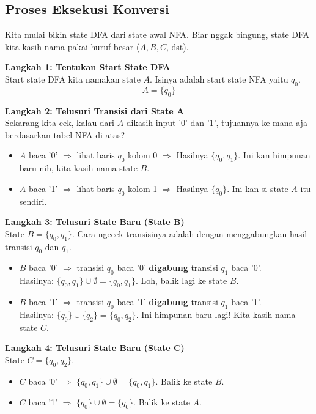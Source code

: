 \documentclass[12pt,a4paper]{article}
\begin{document}
\subsection{Proses Eksekusi Konversi}
Kita mulai bikin state DFA dari state awal NFA. Biar nggak bingung, state DFA kita kasih nama pakai huruf besar ($A, B, C$, dst).

\textbf{Langkah 1: Tentukan Start State DFA} \\
Start state DFA kita namakan state $A$. Isinya adalah start state NFA yaitu $q_0$.
\[ A = \{q_0\} \]

\textbf{Langkah 2: Telusuri Transisi dari State A} \\
Sekarang kita cek, kalau dari $A$ dikasih input '0' dan '1', tujuannya ke mana aja berdasarkan tabel NFA di atas?
\begin{itemize}
    \item $A$ baca '0' $\Rightarrow$ lihat baris $q_0$ kolom 0 $\Rightarrow$ Hasilnya $\{q_0, q_1\}$. Ini kan himpunan baru nih, kita kasih nama state \textbf{$B$}.
    \item $A$ baca '1' $\Rightarrow$ lihat baris $q_0$ kolom 1 $\Rightarrow$ Hasilnya $\{q_0\}$. Ini kan si state \textbf{$A$} itu sendiri.
\end{itemize}

\textbf{Langkah 3: Telusuri State Baru (State B)} \\
State $B = \{q_0, q_1\}$. Cara ngecek transisinya adalah dengan menggabungkan hasil transisi $q_0$ dan $q_1$.
\begin{itemize}
    \item $B$ baca '0' $\Rightarrow$ transisi $q_0$ baca '0' \textbf{digabung} transisi $q_1$ baca '0'. \\
    Hasilnya: $\{q_0, q_1\} \cup \emptyset = \{q_0, q_1\}$. Loh, balik lagi ke state \textbf{$B$}.
    \item $B$ baca '1' $\Rightarrow$ transisi $q_0$ baca '1' \textbf{digabung} transisi $q_1$ baca '1'. \\
    Hasilnya: $\{q_0\} \cup \{q_2\} = \{q_0, q_2\}$. Ini himpunan baru lagi! Kita kasih nama state \textbf{$C$}.
\end{itemize}

\textbf{Langkah 4: Telusuri State Baru (State C)} \\
State $C = \{q_0, q_2\}$. 
\begin{itemize}
    \item $C$ baca '0' $\Rightarrow$ $\{q_0, q_1\} \cup \emptyset = \{q_0, q_1\}$. Balik ke state \textbf{$B$}.
    \item $C$ baca '1' $\Rightarrow$ $\{q_0\} \cup \emptyset = \{q_0\}$. Balik ke state \textbf{$A$}.
\end{itemize}
\end{document}
